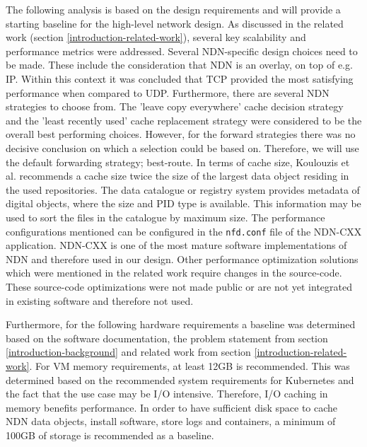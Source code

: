 The following analysis is based on the design requirements and will provide a starting baseline for the high-level network design. As discussed in the related work (section \ref{introduction-related-work}), several key scalability and performance metrics were addressed. Several NDN-specific design choices need to be made. These include the consideration that NDN is an overlay, on top of e.g. IP. Within this context it was concluded that TCP provided the most satisfying performance when compared to UDP. Furthermore, there are several NDN strategies to choose from. The 'leave copy everywhere' cache decision strategy and the 'least recently used' cache replacement strategy were considered to be the overall best performing choices. However, for the forward strategies there was no decisive conclusion on which a selection could be based on. Therefore, we will use the default forwarding strategy; best-route. In terms of cache size, Koulouzis et al. recommends a cache size twice the size of the largest data object residing in the used repositories. The data catalogue or registry system provides metadata of digital objects, where the size and PID type is available. This information may be used to sort the files in the catalogue by maximum size. The performance configurations mentioned can be configured in the \texttt{nfd.conf} file of the NDN-CXX application. NDN-CXX is one of the most mature software implementations of NDN and therefore used in our design. Other performance optimization solutions which were mentioned in the related work require changes in the source-code. These source-code optimizations were not made public or are not yet integrated in existing software and therefore not used.

Furthermore, for the following hardware requirements a baseline was determined based on the software documentation, the problem statement from section \ref{introduction-background} and related work from section \ref{introduction-related-work}. For VM memory requirements, at least 12GB is recommended. This was determined based on the recommended system requirements for Kubernetes \cite{kubernetes-system-requirements} and the fact that the use case may be I/O intensive. Therefore, I/O caching in memory benefits performance. In order to have sufficient disk space to cache NDN data objects, install software, store logs and containers, a minimum of 100GB of storage is recommended as a baseline.

